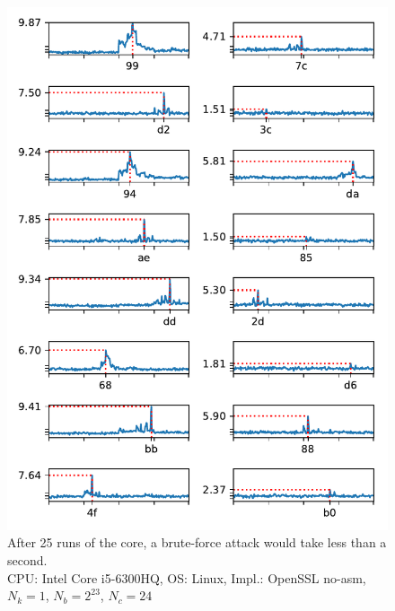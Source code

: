 \documentclass[thesis=B,english]{FITthesis}[2019/03/06]
\begin{document}
\begin{figure}
	\centering
	\includegraphics{full_openssl_success.pdf}
	\caption[A successful attack against OpenSSL fallback implementation]{After 25 runs of the core, a brute-force attack would take less than a second. \\
	CPU: Intel Core i5-6300HQ, OS: Linux, Impl.: OpenSSL no-asm, $N_k = 1$, $N_b = 2^{23}$, $N_c = 24$}
\end{figure}
\end{document}
